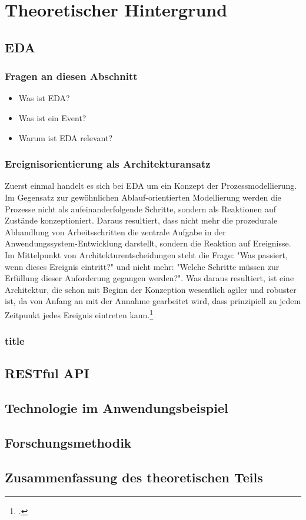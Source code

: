 \section{Theoretischer Hintergrund}
\subsection{\ac{EDA}}
\subsubsection*{Fragen an diesen Abschnitt}
\begin{itemize}
    \item Was ist \ac{EDA}?
    \item Was ist ein Event?
    \item Warum ist \ac{EDA} relevant?
\end{itemize}
\subsubsection*{Ereignisorientierung als Architekturansatz}
Zuerst einmal handelt es sich bei \ac{EDA} um ein Konzept der Prozessmodellierung. Im Gegensatz zur gewöhnlichen Ablauf-orientierten Modellierung werden die Prozesse nicht als aufeinanderfolgende Schritte, sondern als Reaktionen auf Zustände konzeptioniert. Daraus resultiert, dass nicht mehr die prozedurale Abhandlung von Arbeitsschritten die zentrale Aufgabe in der Anwendungssystem-Entwicklung darstellt, sondern die Reaktion auf Ereignisse. Im Mittelpunkt von Architekturentscheidungen steht die Frage: "Was passiert, wenn dieses Ereignis eintritt?" und nicht mehr: "Welche Schritte müssen zur Erfüllung dieser Anforderung gegangen werden?". Was daraus resultiert, ist eine Architektur, die schon mit Beginn der Konzeption wesentlich agiler und robuster ist, da von Anfang an mit der Annahme gearbeitet wird, dass prinzipiell zu jedem Zeitpunkt jedes Ereignis eintreten kann.\footcite[Vgl.][S.30]{EDA2010}
\subsubsection*{title}
\subsection{RESTful \ac{API}}
\subsection{Technologie im Anwendungsbeispiel}
\subsection{Forschungsmethodik}
\subsection{Zusammenfassung des theoretischen Teils}



 
